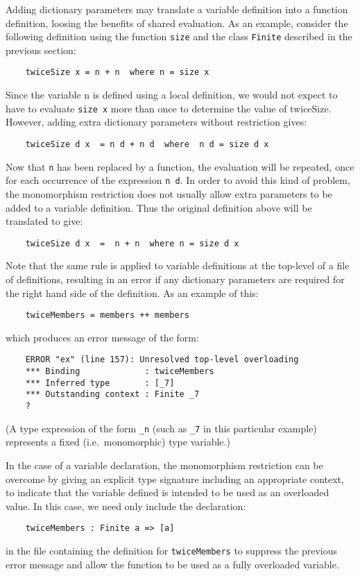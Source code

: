 \IT  Adding dictionary parameters may translate a  variable  definition
     into  a  function  definition,  loosing  the  benefits  of  shared
     evaluation.  As an  example,  consider  the  following  definition
     using the function \verb"size" and the class 
     \verb"Finite"  described  in  the
     previous section:
\begin{verbatim}
    twiceSize x = n + n  where n = size x
\end{verbatim}
     Since the variable n is defined using a local definition, we would
     not expect to have to evaluate \verb"size x" more than once to  determine
     the  value  of  twiceSize.   However,  adding   extra   dictionary
     parameters without restriction gives:
\begin{verbatim}
    twiceSize d x  = n d + n d  where  n d = size d x
\end{verbatim}
     Now that \verb"n" has been replaced by a function, the evaluation will be
     repeated, once for each occurrence of the expression  \verb"n d".   In
     order to avoid this kind of problem, the monomorphism  restriction
     does not usually allow extra parameters to be added to a  variable
     definition.  Thus the original definition above will be translated
     to give:
\begin{verbatim}
    twiceSize d x  =  n + n  where n = size d x
\end{verbatim}
     Note that the same rule is applied to variable definitions at  the
     top-level of a file of definitions, resulting in an error  if  any
     dictionary parameters are required for the right hand side of  the
     definition.  As an example of this:
\begin{verbatim}
    twiceMembers = members ++ members
\end{verbatim}
     which produces an error message of the form:
\begin{verbatim}
    ERROR "ex" (line 157): Unresolved top-level overloading
    *** Binding             : twiceMembers
    *** Inferred type       : [_7]
    *** Outstanding context : Finite _7
    ?
\end{verbatim}
     (A type expression of the form \verb"_n" (such  as  \verb"_7"  in  this
     particular example) represents a  fixed  (i.e.\  monomorphic)  type
     variable.)

     In  the  case  of  a  variable   declaration,   the   monomorphism
     restriction can be overcome by giving an explicit  type  signature
     including an appropriate context, to indicate  that  the  variable
     defined is intended to be used as an overloaded  value.   In  this
     case, we need only include the declaration:
\begin{verbatim}
    twiceMembers : Finite a => [a]
\end{verbatim}
     in the file containing the definition for \verb"twiceMembers" to suppress
     the previous error message and allow the function to be used as  a
     fully overloaded variable.

